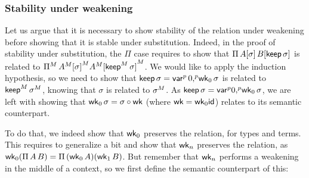   \subsubsection{Stability under weakening}
  Let us argue that it is necessary to show stability of the relation under
  weakening before showing that it is stable under substitution.
  Indeed, in the proof of stability under substitution, the $\Pi$ case
  requires to show that $\Pi \,A[\sigma] \,B[\mathsf{keep}\,\sigma]$ is related to
  ${\Pi}^M\,{A}^M{[\sigma]}^M
  {A}^M{[{\mathsf{keep}}^M\,\sigma]}^M$.
  We would like to apply the induction hypothesis, so we need to show that
  $\mathsf{keep}\,\sigma={\mathsf{var}}^p\,0{,}^p\mathsf{wk}_0\,\sigma$ is related to
  ${\mathsf{keep}}^M\,{\sigma}^M$, knowing that $\sigma$ is
  related to ${\sigma}^M$.
  As $\mathsf{keep}\,\sigma={\mathsf{var}}^p 0{,}^p \mathsf{wk}_0\,\sigma$, we are left with showing that
  $\mathsf{wk}_0\,\sigma=\sigma\circ\mathsf{wk}$ (where $\mathsf{wk}=\mathsf{wk}_0 \mathsf{id}$)
  relates to its semantic counterpart.

  To do that, we indeed show that $\mathsf{wk}_0$ preserves the relation, for types and terms.
  This requires to generalize a bit and show that $\mathsf{wk}_n$ preserves the relation,
  as $\mathsf{wk}_0(\Pi\,A\,B)=\Pi\,(\mathsf{wk}_0\,A)(\mathsf{wk}_1\,B)$.
  But remember that $\mathsf{wk}_n$ performs a weakening in the middle of a context, so
  we first define the semantic counterpart of this:



